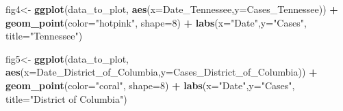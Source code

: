 \documentclass[
]{article}
\newenvironment{Shaded}{\begin{snugshade}}{\end{snugshade}}
\newcommand{\AttributeTok}[1]{\textcolor[rgb]{0.13,0.29,0.53}{#1}}
\newcommand{\DecValTok}[1]{\textcolor[rgb]{0.00,0.00,0.81}{#1}}
\newcommand{\FunctionTok}[1]{\textcolor[rgb]{0.13,0.29,0.53}{\textbf{#1}}}
\newcommand{\NormalTok}[1]{#1}
\newcommand{\OtherTok}[1]{\textcolor[rgb]{0.56,0.35,0.01}{#1}}
\newcommand{\SpecialCharTok}[1]{\textcolor[rgb]{0.81,0.36,0.00}{\textbf{#1}}}
\newcommand{\StringTok}[1]{\textcolor[rgb]{0.31,0.60,0.02}{#1}}
\begin{document}
\begin{Shaded}
\begin{Highlighting}[]
\NormalTok{fig4}\OtherTok{\textless{}{-}} \FunctionTok{ggplot}\NormalTok{(data\_to\_plot, }\FunctionTok{aes}\NormalTok{(}\AttributeTok{x=}\NormalTok{Date\_Tennessee,}\AttributeTok{y=}\NormalTok{Cases\_Tennessee)) }\SpecialCharTok{+}
  \FunctionTok{geom\_point}\NormalTok{(}\AttributeTok{color=}\StringTok{"hotpink"}\NormalTok{, }\AttributeTok{shape=}\DecValTok{8}\NormalTok{) }\SpecialCharTok{+} \FunctionTok{labs}\NormalTok{(}\AttributeTok{x=}\StringTok{"Date"}\NormalTok{,}\AttributeTok{y=}\StringTok{"Cases"}\NormalTok{, }\AttributeTok{title=}\StringTok{"Tennessee"}\NormalTok{)}

\NormalTok{fig5}\OtherTok{\textless{}{-}} \FunctionTok{ggplot}\NormalTok{(data\_to\_plot, }\FunctionTok{aes}\NormalTok{(}\AttributeTok{x=}\NormalTok{Date\_District\_of\_Columbia,}\AttributeTok{y=}\NormalTok{Cases\_District\_of\_Columbia)) }\SpecialCharTok{+}
  \FunctionTok{geom\_point}\NormalTok{(}\AttributeTok{color=}\StringTok{"coral"}\NormalTok{, }\AttributeTok{shape=}\DecValTok{8}\NormalTok{) }\SpecialCharTok{+} \FunctionTok{labs}\NormalTok{(}\AttributeTok{x=}\StringTok{"Date"}\NormalTok{,}\AttributeTok{y=}\StringTok{"Cases"}\NormalTok{, }\AttributeTok{title=}\StringTok{"District of Columbia"}\NormalTok{)}


\end{Highlighting}
\end{Shaded}
\end{document}
